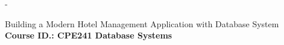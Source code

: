 \begin{titlingpage}
\begin{SingleSpace}
\calccentering{\unitlength}
\begin{adjustwidth*}{\unitlength}{-\unitlength}
\begin{center}
{\HUGE Building a Modern Hotel Management Application with Database System}\\[4mm]
\vspace{5mm}
{\large \textbf{Course ID.: CPE241 Database Systems}}\\
\vspace{3mm}



\end{center}
\end{adjustwidth*}
\end{SingleSpace}
\end{titlingpage}
